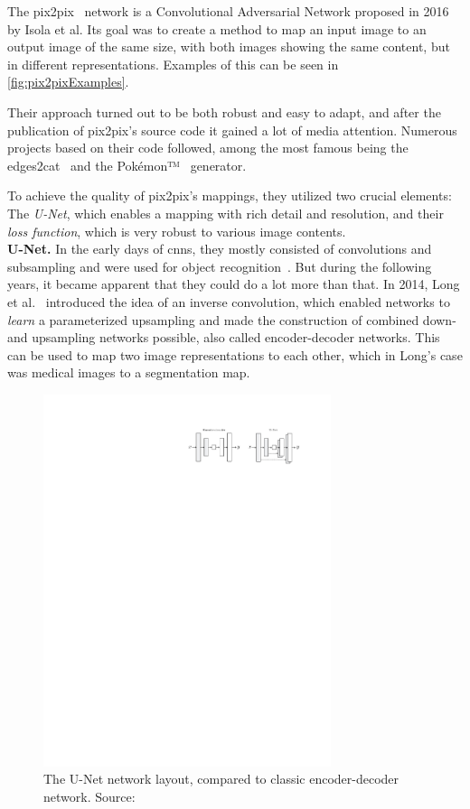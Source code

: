 The \gls{pix2pix}~\cite{pix2pix} network is a Convolutional Adversarial Network proposed in 2016 by Isola et al.
Its goal was to create a method to map an input image to an output image of the same size, with both images showing the same content, but in different representations. Examples of this can be seen in \cref{fig:pix2pixExamples}.

Their approach turned out to be both robust and easy to adapt, and after the publication of \gls{pix2pix}'s source code it gained a lot of media attention. Numerous projects based on their code followed, among the most famous being the edges2cat~\cite{edges2cats} and the Pokémon™~\cite{pokemon} generator.

To achieve the quality of \gls{pix2pix}'s mappings, they utilized two crucial elements: The \emph{U-Net}, which enables a mapping with rich detail and resolution, and their \emph{loss function}, which is very robust to various image contents.\\

\textbf{U-Net.} In the early days of \glspl{cnn}, they mostly consisted of convolutions and subsampling and were used for object recognition~\cite{cnn}. But during the following years, it became apparent that they could do a lot more than that. In 2014, Long et al.~\cite{inverse_conv} introduced the idea of an inverse convolution, which enabled networks to \emph{learn} a parameterized upsampling and made the construction of combined down- and upsampling networks possible, also called encoder-decoder networks. This can be used to map two image representations to each other, which in Long's case was medical images to a segmentation map.

\begin{figure}
  \centering
  \includegraphics[width=0.75\textwidth]{../assets/pix2pix_unet.pdf}
  \caption[U-Net network layout]{The U-Net network layout, compared to classic encoder-decoder network. Source:~\cite{pix2pix}}
  \label{fig:pix2pixUnet}
\end{figure}

